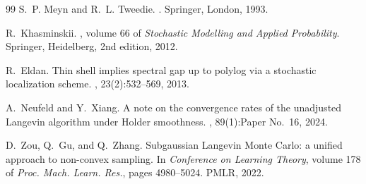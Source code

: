 \documentclass[11pt]{article}
\theoremstyle{definition}
\begin{document}
\begin{thebibliography}{99}
S.~P. Meyn and R.~L. Tweedie.
.
\newblock Springer, London, 1993.

R.~Khasminskii.
, volume 66 of {\em Stochastic Modelling and Applied Probability}.
\newblock Springer, Heidelberg, 2nd edition, 2012.

R.~Eldan.
\newblock Thin shell implies spectral gap up to polylog via a stochastic localization scheme.
, 23(2):532--569, 2013.

A.~Neufeld and Y.~Xiang.
\newblock A note on the convergence rates of the unadjusted {L}angevin algorithm under {H}older smoothness.
, 89(1):Paper No.~16, 2024.

D.~Zou, Q.~Gu, and Q.~Zhang.
\newblock Subgaussian {L}angevin {M}onte {C}arlo: a unified approach to non-convex sampling.
\newblock In {\em Conference on Learning Theory}, volume 178 of {\em Proc. Mach. Learn. Res.}, pages 4980--5024. PMLR, 2022.

\end{thebibliography}
\end{document}
